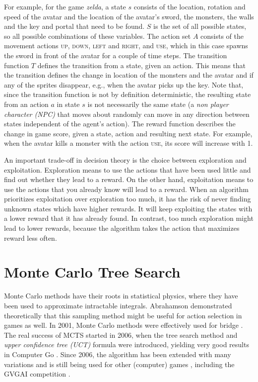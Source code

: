 For example, for the game \textit{zelda}, a state $s$ consists of the location, rotation
and speed of the avatar and the location of the avatar's sword, the monsters, the
walls and the key and portal that need to be found. $S$ is the set of all
possible states, so all possible combinations of these variables. The action set
$A$ consists of the movement actions \textsc{up}, \textsc{down}, \textsc{left}
and \textsc{right}, and \textsc{use}, which in this case spawns the sword in
front of the avatar for a couple of time steps. The transition function $T$
defines the transition from a state, given an action.  This means that the
transition defines the change in location of the monsters and the avatar and if
any of the sprites disappear, e.g., when the avatar picks up the key. Note that,
since the transition function is not by definition deterministic, the resulting
state from an action $a$ in state $s$ is not necessarily the same state
(a \emph{non player character (NPC)} that moves about randomly can move in any direction between
states independent of the agent's action). The reward function describes the
change in game score, given a state, action and resulting next state. For
example, when the avatar kills a monster with the action \textsc{use}, its score
will increase with 1.

An important trade-off in decision theory is the choice between exploration and
exploitation. Exploration means to use the actions that have been used little
and find out whether they lead to a reward. On the other hand, exploitation
means to use the actions that you already know will lead to a reward. When an
algorithm prioritizes exploitation over exploration too much, it has the risk of
never finding unknown states which have higher rewards. It will keep exploiting
the states with a lower reward that it has already found. In contrast, too much
exploration might lead to lower rewards, because the algorithm takes the action
that maximizes reward less often.

\section{Monte Carlo Tree Search}
\label{subsec:mcts}
Monte Carlo methods have their roots in statistical physics, where they have
been used to approximate intractable integrals. Abrahamson
\cite{abramson1990expected} demonstrated theoretically that this sampling method
might be useful for action selection in games as well.  In 2001, Monte Carlo
methods were effectively used for bridge \cite{ginsberg2001gib}. The real
success of MCTS started in 2006, when the tree search method and \emph{upper
confidence tree (UCT)} formula
were introduced, yielding very good results in Computer Go
\cite{gelly2006modification}. Since 2006, the algorithm has been extended with
many variations and is still being used for other (computer) games
\cite{browne2012survey}, including the GVGAI competition
\cite{perez2014knowledge}.

